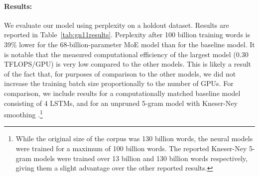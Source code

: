 \documentclass{article} \pdfoutput=1
\begin{document}
\begin{table}[h!]
\caption{ Model comparison on 100 Billion Word Google News Dataset}
\label{tab:gn11results}
\begin{center}
\setlength\tabcolsep{3pt}
\end{center}
\end{table}

\paragraph{Results:} We evaluate our model using perplexity on a holdout dataset.   Results are reported in Table~\ref{tab:gn11results}.  Perplexity after 100 billion training words is 39\% lower for the 68-billion-parameter MoE model than for the baseline model.   It is notable that the measured computational efficiency of the largest model (0.30 TFLOPS/GPU) is very low compared to the other models.  This is likely a result of the fact that, for purposes of comparison to the other models, we did not increase the training batch size proportionally to the number of GPUs.  For comparison, we include results for a computationally matched baseline model consisting of 4 LSTMs, and for an unpruned 5-gram model with Kneser-Ney smoothing \citep{KneserNey95}.\footnote{While the original size of the corpus was 130 billion words, the neural models were trained for a maximum of 100 billion words.  The reported Kneser-Ney 5-gram models were trained over 13 billion and 130 billion words respectively, giving them a slight advantage over the other reported results.}
\end{document}
